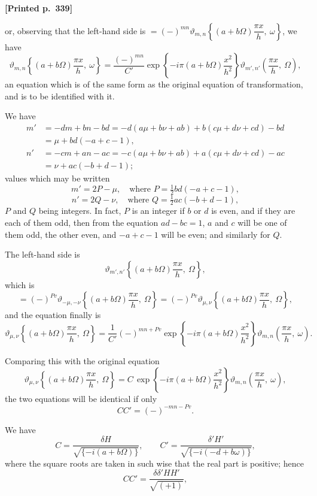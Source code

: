 \documentclass[11pt]{article}
\begin{document}
\medskip

\noindent\textbf{[Printed p.~339]}\hfill

\noindent or, observing that the left-hand side is $=(-)^{mn}\vartheta_{m,n}\!\left\{(a+b\Omega)\dfrac{\pi x}{h},\ \omega\right\}$, we have
\[
\vartheta_{m,n}\!\left\{(a+b\Omega)\frac{\pi x}{h},\ \omega\right\} = \frac{(-)^{mn}}{C'}\exp\!\left\{-i\pi(a+b\Omega)\frac{x^{2}}{h^{2}}\right\}\vartheta_{m',n'}\!\left(\frac{\pi x}{h},\ \Omega\right),
\]
an equation which is of the same form as the original equation of transformation, and is to be identified with it.

We have
\begin{align*}
m' &= -dm + bn - bd = -d(a\mu + b\nu + ab) + b(c\mu + d\nu + cd) - bd \\
   &= \mu + bd(-a + c - 1), \\
n' &= -cm + an - ac = -c(a\mu + b\nu + ab) + a(c\mu + d\nu + cd) - ac \\
   &= \nu + ac(-b + d - 1);
\end{align*}
values which may be written
\[
m' = 2P - \mu,\quad \text{where } P = \tfrac{1}{2}bd(-a + c - 1),
\]
\[
n' = 2Q - \nu,\quad \text{where } Q = \tfrac{1}{2}ac(-b + d - 1),
\]
$P$ and $Q$ being integers. In fact, $P$ is an integer if $b$ or $d$ is even, and if they are each of them odd, then from the equation $ad - bc = 1$, $a$ and $c$ will be one of them odd, the other even, and $-a + c - 1$ will be even; and similarly for $Q$.

The left-hand side is
\[
\vartheta_{m',n'}\!\left\{(a+b\Omega)\frac{\pi x}{h},\ \Omega\right\},
\]
which is
\[
= (-)^{Pv}\vartheta_{-\mu,-\nu}\!\left\{(a+b\Omega)\frac{\pi x}{h},\ \Omega\right\} = (-)^{Pv}\vartheta_{\mu,\nu}\!\left\{(a+b\Omega)\frac{\pi x}{h},\ \Omega\right\},
\]
and the equation finally is
\[
\vartheta_{\mu,\nu}\!\left\{(a+b\Omega)\frac{\pi x}{h},\ \Omega\right\} = \frac{1}{C'}(-)^{mn + Pv}\exp\!\left\{-i\pi(a+b\Omega)\frac{x^{2}}{h^{2}}\right\}\vartheta_{m,n}\!\left(\frac{\pi x}{h},\ \omega\right).
\]

Comparing this with the original equation
\[
\vartheta_{\mu,\nu}\!\left\{(a+b\Omega)\frac{\pi x}{h},\ \Omega\right\} = C\,\exp\!\left\{-i\pi(a+b\Omega)\frac{x^{2}}{h^{2}}\right\}\vartheta_{m,n}\!\left(\frac{\pi x}{h},\ \omega\right),
\]
the two equations will be identical if only
\[
CC' = (-)^{-mn - Pv}.
\]

We have
\[
C = \frac{\delta H}{\sqrt{\{-i(a+b\Omega)\}}},\qquad C' = \frac{\delta' H'}{\sqrt{\{-i(-d+b\omega)\}}},
\]
where the square roots are taken in such wise that the real part is positive; hence
\[
CC' = \frac{\delta\delta' H H'}{\sqrt{(+1)}},
\]
\end{document}
